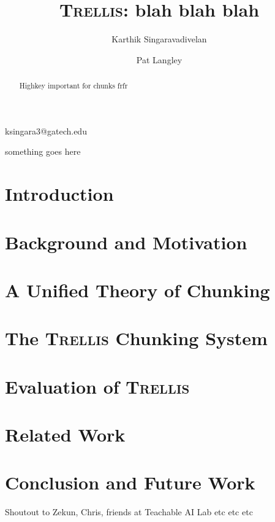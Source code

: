 \documentclass[11pt,letterpaper]{article}
\begin{document}
 

\title{\textsc{Trellis}: blah blah blah}
 
\author{Karthik Singaravadivelan}{ksingara3@gatech.edu}
\author{Pat Langley}{something goes here}
\address{Institute for the Study of Learning and Expertise, 
         2164 Staunton Court, Palo Alto, CA 94306 USA}
\vskip 0.2in
 
\begin{abstract}
Highkey important for chunks frfr
\end{abstract}

\section{Introduction} 

\section{Background and Motivation}

\section{A Unified Theory of Chunking}

\section{The \textsc{Trellis} Chunking System}

\section{Evaluation of \textsc{Trellis}}

\section{Related Work}

\section{Conclusion and Future Work}
 
\begin{acknowledgements} 
\noindent
Shoutout to Zekun, Chris, friends at Teachable AI Lab etc etc etc
\end{acknowledgements} 

\vspace{-0.25in}

{\parindent -10pt\leftskip 10pt\noindent



}

\end{document}
